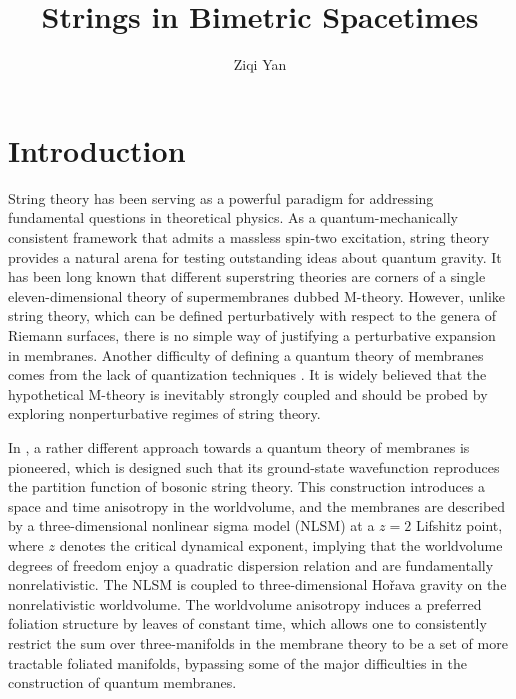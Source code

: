 \documentclass[11pt]{article}
\title{\ \vspace{1.6cm} \\
Strings in Bimetric Spacetimes}
\author{Ziqi Yan}
\affiliation{
Nordita, KTH Royal Institute of Technology and Stockholm University\\
Hannes Alfv\'{e}ns v\"{a}g 12, SE-106 91 Stockholm, Sweden}
\begin{document}

\maketitle
\vfill\eject

\section{Introduction} \label{sec:intro}


String theory has been serving as a powerful paradigm for addressing fundamental questions in theoretical physics. As a quantum-mechanically consistent framework that admits a massless spin-two excitation, string theory provides a natural arena for testing outstanding ideas about quantum gravity. It has been long known that different superstring theories are corners of a single eleven-dimensional theory of supermembranes dubbed M-theory. However, unlike string theory, which can be defined perturbatively with respect to the genera of Riemann surfaces, there is no simple way of justifying a perturbative expansion in membranes. Another difficulty of defining a quantum theory of membranes comes from the lack of quantization techniques \cite{Horava:1995qa}. It is widely believed that the hypothetical M-theory is inevitably strongly coupled and should be probed by exploring nonperturbative regimes of string theory.

In \cite{Horava:2008ih}, a rather different approach towards a quantum theory of membranes is pioneered, which is designed such that its ground-state wavefunction reproduces the partition function of bosonic string theory. This construction introduces a space and time anisotropy in the worldvolume, and the membranes are described by a three-dimensional nonlinear sigma model (NLSM) at a $z=2$ Lifshitz point, where $z$ denotes the critical dynamical exponent, implying that the worldvolume degrees of freedom enjoy a quadratic dispersion relation and are fundamentally nonrelativistic. The NLSM is coupled to three-dimensional Ho\v{r}ava gravity on the nonrelativistic worldvolume. The worldvolume anisotropy induces a preferred foliation structure by leaves of constant time, which allows one to consistently restrict the sum over three-manifolds in the membrane theory to be a set of more tractable foliated manifolds, bypassing some of the major difficulties in the construction of quantum membranes. 
\end{document}
